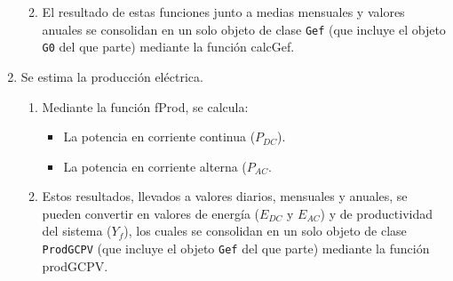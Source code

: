 \begin{enumerate}
\begin{enumerate}
\begin{itemize}
\end{itemize}
\item El resultado de estas funciones junto a medias mensuales y valores anuales se consolidan en un solo objeto de clase \texttt{Gef} (que incluye el objeto \texttt{G0} del que parte) mediante la función calcGef.
\end{enumerate}
\item Se estima la producción eléctrica.
\begin{enumerate}
\item Mediante la función fProd, se calcula:
\begin{itemize}
\item La potencia en corriente continua (\(P_{DC}\)).
\item La potencia en corriente alterna (\(P_{AC}\).
\end{itemize}
\item Estos resultados, llevados a valores diarios, mensuales y anuales, se pueden convertir en valores de energía (\(E_{DC}\) y \(E_{AC}\)) y de productividad del sistema (\(Y_f\)), los cuales se consolidan en un solo objeto de clase \texttt{ProdGCPV} (que incluye el objeto \texttt{Gef} del que parte) mediante la función prodGCPV.
\end{enumerate}
\end{enumerate}
